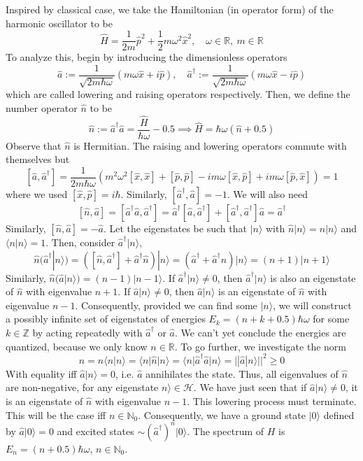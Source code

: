 \documentclass[a4paper]{article}
\begin{document}
\begin{note}
Inspired by classical case, we take the Hamiltonian (in operator form) of the harmonic oscillator to be
$$\hat{H}=\frac{1}{2m}\hat{p}^2+\frac{1}{2}m\omega^2\hat{x}^2,\quad \omega\in\mathbb{R},~m\in\mathbb{R}$$
To analyze this, begin by introducing the dimensionless operators
$$\hat{a}:=\frac{1}{\sqrt{2m\hbar\omega}}(m\omega\hat{x}+i\hat{p}),\quad\hat{a}^\dag:=\frac{1}{\sqrt{2m\hbar\omega}}(m\omega\hat{x}-i\hat{p})$$
which are called lowering and raising operators respectively. Then, we define the number operator $\hat{n}$ to be
$$\hat{n}:=\hat{a}^\dag\hat{a}=\frac{\hat{H}}{\hbar\omega}-0.5\implies\hat{H}=\hbar\omega(\hat{n}+0.5)$$
Observe that $\hat{n}$ is Hermitian. The raising and lowering operators commute with themselves but 
$$[\hat{a},\hat{a}^\dag]=\frac{1}{2m\hbar\omega}(m^2\omega^2[\hat{x},\hat{x}]+[\hat{p},\hat{p}]-im\omega[\hat{x},\hat{p}]+im\omega[\hat{p},\hat{x}])=1$$
where we used $[\hat{x},\hat{p}]=i\hbar$. Similarly, $[\hat{a}^\dag,\hat{a}]=-1$. We will also need $$[\hat{n},\hat{a}]=[\hat{a}^\dag\hat{a},\hat{a}^\dag]=\hat{a}^\dag[\hat{a},\hat{a}^\dag]+[\hat{a}^\dag,\hat{a}^\dag]\hat{a}=\hat{a}^\dag$$
Similarly, $[\hat{n},\hat{a}]=-\hat{a}$. Let the eigenstates be such that $|n\rangle$ with $\hat{n}|n\rangle=n|n\rangle$ and $\langle n|n\rangle=1$. Then, consider $\hat{a}^\dag|n\rangle$,
$$\hat{n}(\hat{a}^\dag|n\rangle)=([\hat{n},\hat{a}^\dag]+\hat{a}^\dag\hat{n})|n\rangle=(\hat{a}^\dag+\hat{a}^\dag\hat{n})|n\rangle=(n+1)|n+1\rangle$$
Similarly, $\hat{n}(\hat{a}|n\rangle)=(n-1)|n-1\rangle$. If $\hat{a}^\dag|n\rangle\neq0$, then $\hat{a}^\dag|n\rangle$ is also an eigenstate of $\hat{n}$ with eigenvalue $n+1$. If $\hat{a}|n\rangle\neq0$, then $\hat{a}|n\rangle$ is an eigenstate of $\hat{n}$ with eigenvalue $n-1$. Consequently, provided we can find some $|n\rangle$, we will construct a possibly infinite set of eigenstates of energies $E_k=(n+k+0.5)\hbar\omega$ for some $k\in\mathbb{Z}$ by acting repeatedly with $\hat{a}^\dag$ or $\hat{a}$. We can't yet conclude the energies are quantized, because we only know $n\in\mathbb{R}$. To go further, we investigate the norm
$$n=n\langle n|n\rangle=\langle n|\hat{n}|n\rangle=\langle n|\hat{a}^\dag\hat{a}|n\rangle=||\hat{a}|n\rangle||^2\geq0$$
With equality iff $\hat{a}|n\rangle=0$, i.e. $\hat{a}$ annihilates the state. Thus, all eigenvalues of $\hat{n}$ are non-negative, for any eigenstate $n\rangle\in\mathcal{H}$. We have just seen that if $\hat{a}|n\rangle\neq0$, it is an eigenstate of $\hat{n}$ with eigenvalue $n-1$. This lowering process must terminate. This will be the case iff $n\in\mathbb{N}_0$. Consequently, we have a ground state $|0\rangle$ defined by $\hat{a}|0\rangle=0$ and excited states $\sim(\hat{a}^\dag)^n|0\rangle$. The spectrum of $H$ is $E_n=(n+0.5)\hbar\omega$, $n\in\mathbb{N}_0$.\\[5pt]

\end{note}
\end{document}
